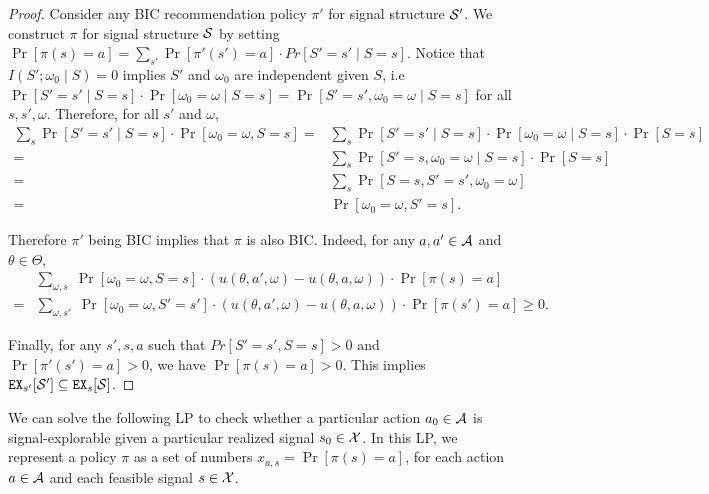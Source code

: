 \begin{proof}
Consider any BIC recommendation policy $\pi'$ for signal structure $\S'$. We construct $\pi$ for signal structure $\S$ by setting $\Pr[\pi(s) = a] = \sum_{s'} \Pr[\pi'(s') = a] \cdot Pr[S' = s'\mid S = s]$. Notice that $I(S' ; \omega_0\mid S) = 0$ implies $S'$ and $\omega_0$ are independent given $S$, i.e $\Pr[S' = s'\mid S=s] \cdot \Pr[\omega_0 = \omega\mid S=s] = \Pr[S'=s', \omega_0 = \omega\mid S=s]$ for all $s,s',\omega$. Therefore, for all $s'$ and $\omega$,
\begin{align*}
\textstyle
\sum_s \Pr[S' = s'\mid S = s] \cdot \Pr[\omega_0 = \omega, S= s]
=& \textstyle \sum_s \Pr[S' = s'\mid S=s]
    \cdot \Pr[\omega_0 = \omega\mid S=s] \cdot \Pr[S=s] \\
=& \textstyle  \sum_s \Pr[S'=s,\omega_0 =\omega\mid S=s] \cdot \Pr[S=s] \\
= &\textstyle  \sum_s \Pr[S=s,S'=s',\omega_0 =\omega] \\
= &\Pr[\omega_0 =\omega, S'=s].
\end{align*}

Therefore $\pi'$ being BIC implies that $\pi$ is also BIC. Indeed, for any $a,a' \in \A$ and $\theta \in \varTheta$,
\begin{align*}
&\textstyle \sum_{\omega,s}\; \Pr[\omega_0 = \omega, S = s] \cdot (u(\theta,a', \omega) - u(\theta,a,\omega)) \cdot \Pr[\pi(s) = a] \\
=& \textstyle \sum_{\omega,s'}\;\Pr[\omega_0 = \omega, S' = s'] \cdot (u(\theta,a', \omega) - u(\theta,a,\omega)) \cdot \Pr[\pi(s') = a]
\geq 0.
\end{align*}


Finally, for any $s', s ,a$ such that $Pr[S' = s',S = s] >0 $ and $\Pr[\pi'(s') = a] >0$, we have $\Pr[\pi(s) = a] > 0$. This implies $\EX_{s'}[\S'] \subseteq \EX_s[\S]$.
\end{proof}

We can solve the following LP to check whether a particular action $a_0 \in\A$ is signal-explorable given a particular realized signal $s_0\in\X$. In this LP, we represent a policy $\pi$ as a set of numbers
    $x_{a,s} = \Pr[\pi(s)=a]$,
for each action $a\in \A$ and each feasible signal $s\in \X$.


